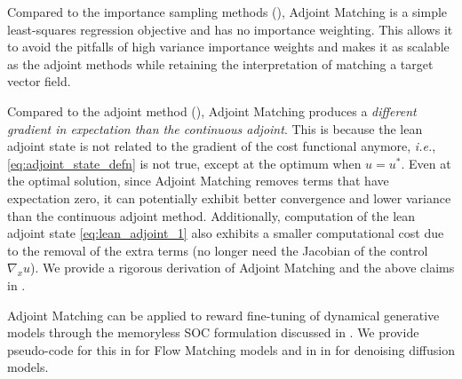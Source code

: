 \documentclass[]{fairmeta}
\makeatletter
\newcommand*{\eg}{{\it e.g.}\@\xspace}
\newcommand*{\ie}{{\it i.e.}\@\xspace}
\makeatother
\begin{document}
Compared to the importance sampling methods (), Adjoint Matching is a simple least-squares regression objective and has no importance weighting. This allows it to avoid the pitfalls of high variance importance weights and makes it as scalable as the adjoint methods while retaining the interpretation of matching a target vector field.

Compared to the adjoint method (), Adjoint Matching produces a \emph{different gradient in expectation than the continuous adjoint}. This is because the lean adjoint state is not related to the gradient of the cost functional anymore, \ie, \eqref{eq:adjoint_state_defn} is not true, except at the optimum when $u=u^*$.
Even at the optimal solution, since Adjoint Matching removes terms that have expectation zero, it can potentially exhibit better convergence and lower variance than the continuous adjoint method. 
Additionally, computation of the lean adjoint state \eqref{eq:lean_adjoint_1} also exhibits a smaller computational cost due to the removal of the extra terms (no longer need the Jacobian of the control $\nabla_x u$).
We provide a rigorous derivation of Adjoint Matching and the above claims in .

Adjoint Matching can be applied to reward fine-tuning of dynamical generative models through the memoryless SOC formulation discussed in . We provide pseudo-code for this in  for Flow Matching models and in  in  for denoising diffusion models.



\end{document}
